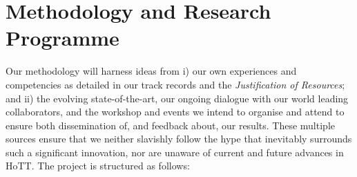 \documentclass[a4paper,11pt]{article}
\begin{document}







\vspace*{-0.2in}

\section{Methodology and Research Programme}
\vspace*{-0.1in}

Our methodology will harness ideas from i) our own experiences and
competencies as detailed in our track records and the {\em
  Justification of Resources}; and 
ii) the evolving state-of-the-art, our ongoing dialogue with our world
leading collaborators, and the workshop and events we intend to
organise and attend to ensure both dissemination of, and feedback about, our
results. These multiple sources ensure that we neither slavishly
follow the hype that inevitably surrounds such a significant innovation, nor
are unaware of current and future advances in HoTT.  The project is
structured as follows:
\end{document}
